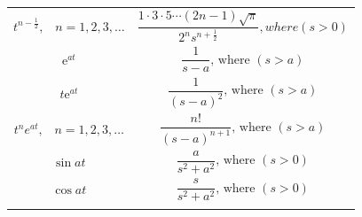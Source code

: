 \documentclass[
]{book}
\begin{document}
\begin{longtable}[]{@{}ll@{}}
\begin{minipage}[t]{0.42\columnwidth}\raggedright
\[{t^{n - \frac{1}{2}}},\,\,\,\,\,n = 1,2,3, \ldots\]\strut
\end{minipage} & \begin{minipage}[t]{0.52\columnwidth}\raggedright
\[\frac{{1 \cdot 3 \cdot 5 \cdots \left( {2n - 1} \right)\sqrt \pi  }}{{{2^n}{s^{n + \frac{1}{2}}}}} {, where } \left(s\gt 0\right) \]\strut
\end{minipage}\tabularnewline
\begin{minipage}[t]{0.42\columnwidth}\raggedright
\[\mathrm{e}^{at}\]\strut
\end{minipage} & \begin{minipage}[t]{0.52\columnwidth}\raggedright
\[ \frac{1}{s-a} \text{, where } \left(s\gt a \right) \]\strut
\end{minipage}\tabularnewline
\begin{minipage}[t]{0.42\columnwidth}\raggedright
\[t\mathrm{e}^{at}\]\strut
\end{minipage} & \begin{minipage}[t]{0.52\columnwidth}\raggedright
\[\frac{1}{{\left( {s - a} \right)}^{2}} \text{, where } \left(s\gt a \right) \]\strut
\end{minipage}\tabularnewline
\begin{minipage}[t]{0.42\columnwidth}\raggedright
\[{t^n}{{e}^{at}},\,\,\,\,\,n = 1,2,3, \ldots\]\strut
\end{minipage} & \begin{minipage}[t]{0.52\columnwidth}\raggedright
\[\frac{{n!}}{{{{\left( {s - a} \right)}^{n + 1}}}} \text{, where } \left(s\gt a \right) \]\strut
\end{minipage}\tabularnewline
\begin{minipage}[t]{0.42\columnwidth}\raggedright
\[\sin{at} \]\strut
\end{minipage} & \begin{minipage}[t]{0.52\columnwidth}\raggedright
\[\frac{a}{s^2 + a^2} \text{, where } \left(s\gt 0 \right) \]\strut
\end{minipage}\tabularnewline
\begin{minipage}[t]{0.42\columnwidth}\raggedright
\[\cos{at}\]\strut
\end{minipage} & \begin{minipage}[t]{0.52\columnwidth}\raggedright
\[\frac{s}{s^2 + a^2} \text{, where } \left(s\gt 0 \right) \]\strut
\end{minipage}\tabularnewline
\begin{minipage}[t]{0.42\columnwidth}\raggedright

\end{minipage}
\end{longtable}
\end{document}
